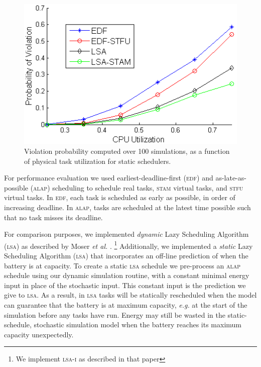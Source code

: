 \begin{figure}[tb]
\begin{center}
\includegraphics[scale=0.57]{violations_vs_cpuutil.png}
\caption{
Violation probability computed over 100 simulations, as a function of physical task utilization for static schedulers.\label{fig:violations_vs_cpuutil}
}
\end{center}
\end{figure}


For performance evaluation we 
used earliest-deadline-first (\textsc{edf}) and as-late-as-possible (\textsc{alap}) scheduling to schedule real tasks, \textsc{stam} virtual tasks, and \textsc{stfu} virtual tasks. 
In \textsc{edf}, each task is scheduled as early as possible, in order of increasing deadline.  
In \textsc{alap}, tasks are scheduled at the latest time possible such that no task misses its deadline.  

For comparison purposes, we implemented \emph{dynamic} Lazy Scheduling Algorithm (\textsc{lsa}) 
as described by Moser \emph{et al.} \cite{moser2007real}.  
\footnote{We implement \textsc{lsa-i} as described in that paper} 
Additionally, we implemented a \emph{static} Lazy Scheduling Algorithm (\textsc{lsa}) that incorporates 
an off-line prediction of when the battery is at capacity. 
To create a static \textsc{lsa} schedule we pre-process an \textsc{alap} schedule using our dynamic simulation routine, with a constant minimal energy input in place of the stochastic input.  This constant input is the prediction we give to \textsc{lsa}.  As a result, in \textsc{lsa} tasks will be statically rescheduled when the model can guarantee that the battery is at maximum capacity, \emph{e.g.} at the start of the simulation before any tasks have run.  Energy may still be wasted in the static-schedule, stochastic simulation model when the battery reaches its maximum capacity unexpectedly.  

